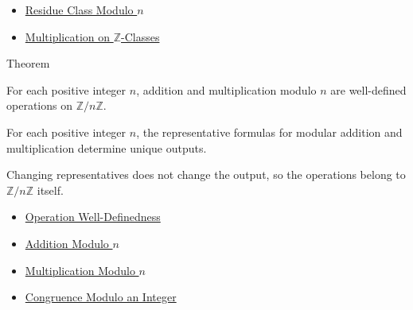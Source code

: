 \begin{dependencies}
\begin{itemize}
  \item \hyperref[def:residue-class-modulo-n]{Residue Class Modulo \(n\)}
  \item \hyperref[def:multiplication-on-z-classes]{Multiplication on \(\mathbb{Z}\)-Classes}
\end{itemize}
\end{dependencies}

\begin{theorembox}{Theorem}
\begin{theorem}
\label{thm:modular-operations-well-defined}
For each positive integer \(n\), addition and multiplication modulo \(n\) are
well-defined operations on \(\mathbb{Z}/n\mathbb{Z}\).
\end{theorem}

\begin{remark*}
For each positive integer \(n\), the representative formulas for modular
addition and multiplication determine unique outputs.
\end{remark*}

\begin{remark*}[Interpretation]
Changing representatives does not change the output, so the operations
belong to \(\mathbb{Z}/n\mathbb{Z}\) itself.
\end{remark*}
\end{theorembox}

\begin{dependencies}
\begin{itemize}
  \item \hyperref[def:operation-well-definedness]{Operation Well-Definedness}
  \item \hyperref[def:addition-modulo-n]{Addition Modulo \(n\)}
  \item \hyperref[def:multiplication-modulo-n]{Multiplication Modulo \(n\)}
  \item \hyperref[def:congruence-modulo-integer]{Congruence Modulo an Integer}
\end{itemize}
\end{dependencies}

